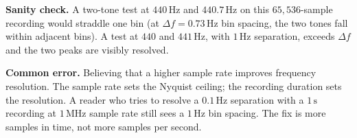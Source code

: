 \begin{exercise}
\textbf{Sanity check.} A two-tone test at $440 \,\si{\hertz}$ and
$440.7 \,\si{\hertz}$ on this $65{,}536$-sample recording would
straddle one bin (at $\Delta f = 0.73 \,\si{\hertz}$ bin spacing,
the two tones fall within adjacent bins). A test at $440$ and
$441 \,\si{\hertz}$, with $1 \,\si{\hertz}$ separation, exceeds
$\Delta f$ and the two peaks are visibly resolved.

\textbf{Common error.} Believing that a higher sample rate
improves frequency resolution. The sample rate sets the Nyquist
ceiling; the recording duration sets the resolution. A reader
who tries to resolve a $0.1 \,\si{\hertz}$ separation with a
$1 \,\si{\second}$ recording at $1 \,\si{\mega\hertz}$ sample
rate still sees a $1 \,\si{\hertz}$ bin spacing. The fix is more
samples in time, not more samples per second.
\end{exercise}

